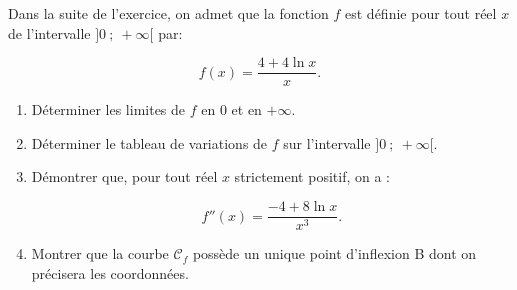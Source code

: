Dans la suite de l'exercice, on admet que la fonction $f$ est définie pour tout réel $x$ de l'intervalle $]0~;~ +\infty[$ par:

\[f(x) = \dfrac{4 + 4\ln x}{x}.\]

\begin{enumerate}[resume]
\item Déterminer les limites de $f$ en $0$ et en $+\infty$.
\item Déterminer le tableau de variations de $f$ sur l'intervalle $]0~;~ +\infty[$. 
\item Démontrer que, pour tout réel $x$ strictement positif, on a :

\[f''(x) = \dfrac{- 4 + 8\ln x}{x^3}.\]

\item Montrer que la courbe $\mathcal{C}_f$ possède un unique point d'inflexion B dont on précisera les coordonnées.
\end{enumerate}
